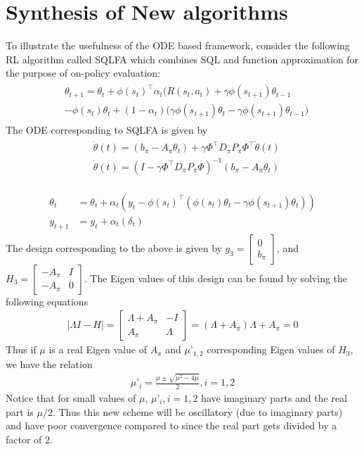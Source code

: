 \section{Synthesis of New algorithms}
To illustrate the usefulness of the ODE based framework, consider the following RL algorithm called SQLFA which combines SQL and function approximation for the purpose of on-policy evaluation:
\begin{align}\label{sqlfa}
\begin{split}
&\theta_{t+1}=\theta_t+\phi(s_t)^\top \alpha_t\big(R(s_t,a_t)+\gamma \phi(s_{t+1})\theta_{t-1}\\&-\phi(s_t)\theta_t +(1-\alpha_t)(\gamma \phi(s_{t+1})\theta_t-\gamma \phi(s_{t+1})\theta_{t-1}\big)
\end{split}
\end{align}
The ODE corresponding to SQLFA is given by
\begin{align}
\begin{split}
&\dot{\theta}(t)=(b_\pi-A_\pi\theta_t)+\gamma\Phi^\top D_\pi P_\pi\Phi^\top\dot{\theta}(t)\\
&\dot{\theta}(t)=(I-\gamma\Phi^\top D_\pi P_\pi\Phi)^{-1}(b_\pi-A_\pi\theta_t)
\end{split}
\end{align}

\begin{align}
\begin{split}
\theta_t&=\theta_t+\alpha_t(y_t-\phi(s_t)^\top(\phi(s_t)\theta_t-\gamma \phi(s_{t+1})\theta_t))\\
y_{t+1}&=y_{t}+\alpha_t(\delta_t)
\end{split}
\end{align}
The design corresponding to the above is given by $g_3=\begin{bmatrix}0\\ b_\pi\end{bmatrix}$, and $H_3=\begin{bmatrix} -A_\pi & I \\ -A_\pi & 0\end{bmatrix}$. The Eigen values of this design can be found by solving the following equations
\begin{align}
|\Lambda I-H|=\begin{bmatrix} \Lambda+A_\pi & -I \\ A_\pi & \Lambda\end{bmatrix}=(\Lambda+A_\pi)\Lambda+A_\pi=0
\end{align}
Thus if $\mu$ is a real Eigen value of $A_\pi$ and $\mu’_{1,2}$ corresponding Eigen values of $H_3$, we have the relation
\begin{align}
\mu’_{i}=\frac{\mu\pm\sqrt{\mu^2-4\mu}}{2}, i=1,2
\end{align}
Notice that for small values of $\mu$, $\mu’_i, i=1,2$ have imaginary parts and the real part is $\mu/2$. Thus this new scheme will be oscillatory (due to imaginary parts) and have poor convergence compared to \tdo since the real part gets divided by a factor of $2$.
